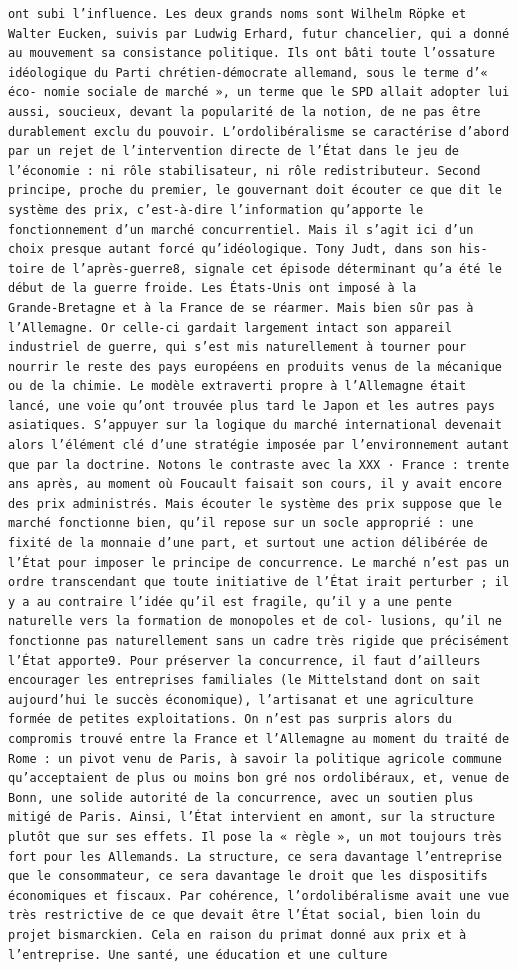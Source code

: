 \documentclass[
  letterpaper,
  DIV=11,
  numbers=noendperiod]{scrreprt}
\begin{document}
\begin{verbatim}
ont subi l’influence. Les deux grands noms sont Wilhelm Röpke et Walter Eucken, suivis par Ludwig Erhard, futur chancelier, qui a donné au mouvement sa consistance politique. Ils ont bâti toute l’ossature idéologique du Parti chrétien‑démocrate allemand, sous le terme d’« éco‑ nomie sociale de marché », un terme que le SPD allait adopter lui aussi, soucieux, devant la popularité de la notion, de ne pas être durablement exclu du pouvoir. L’ordolibéralisme se caractérise d’abord par un rejet de l’intervention directe de l’État dans le jeu de l’économie : ni rôle stabilisateur, ni rôle redistributeur. Second principe, proche du premier, le gouvernant doit écouter ce que dit le système des prix, c’est‑à‑dire l’information qu’apporte le fonctionnement d’un marché concurrentiel. Mais il s’agit ici d’un choix presque autant forcé qu’idéologique. Tony Judt, dans son his‑ toire de l’après‑guerre8, signale cet épisode déterminant qu’a été le début de la guerre froide. Les États‑Unis ont imposé à la Grande‑Bretagne et à la France de se réarmer. Mais bien sûr pas à l’Allemagne. Or celle‑ci gardait largement intact son appareil industriel de guerre, qui s’est mis naturellement à tourner pour nourrir le reste des pays européens en produits venus de la mécanique ou de la chimie. Le modèle extraverti propre à l’Allemagne était lancé, une voie qu’ont trouvée plus tard le Japon et les autres pays asiatiques. S’appuyer sur la logique du marché international devenait alors l’élément clé d’une stratégie imposée par l’environnement autant que par la doctrine. Notons le contraste avec la XXX · France : trente ans après, au moment où Foucault faisait son cours, il y avait encore des prix administrés. Mais écouter le système des prix suppose que le marché fonctionne bien, qu’il repose sur un socle approprié : une fixité de la monnaie d’une part, et surtout une action délibérée de l’État pour imposer le principe de concurrence. Le marché n’est pas un ordre transcendant que toute initiative de l’État irait perturber ; il y a au contraire l’idée qu’il est fragile, qu’il y a une pente naturelle vers la formation de monopoles et de col‑ lusions, qu’il ne fonctionne pas naturellement sans un cadre très rigide que précisément l’État apporte9. Pour préserver la concurrence, il faut d’ailleurs encourager les entreprises familiales (le Mittelstand dont on sait aujourd’hui le succès économique), l’artisanat et une agriculture formée de petites exploitations. On n’est pas surpris alors du compromis trouvé entre la France et l’Allemagne au moment du traité de Rome : un pivot venu de Paris, à savoir la politique agricole commune qu’acceptaient de plus ou moins bon gré nos ordolibéraux, et, venue de Bonn, une solide autorité de la concurrence, avec un soutien plus mitigé de Paris. Ainsi, l’État intervient en amont, sur la structure plutôt que sur ses effets. Il pose la « règle », un mot toujours très fort pour les Allemands. La structure, ce sera davantage l’entreprise que le consommateur, ce sera davantage le droit que les dispositifs économiques et fiscaux. Par cohérence, l’ordolibéralisme avait une vue très restrictive de ce que devait être l’État social, bien loin du projet bismarckien. Cela en raison du primat donné aux prix et à l’entreprise. Une santé, une éducation et une culture 
\end{verbatim}
\end{document}
